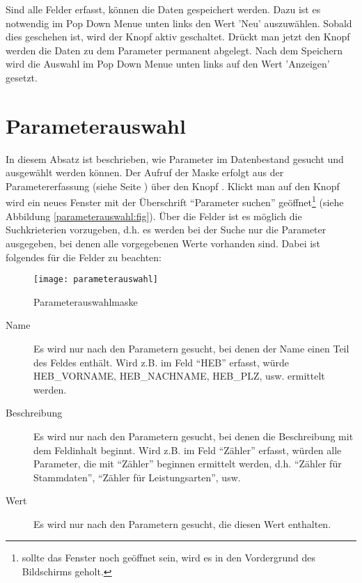 Sind alle Felder erfasst, können die Daten gespeichert werden. Dazu ist
es notwendig im Pop Down Menue unten links den Wert 'Neu' auszuwählen.
Sobald dies geschehen ist, wird der Knopf  aktiv 
geschaltet. Drückt man jetzt den Knopf  werden die Daten
zu dem Parameter permanent abgelegt. Nach dem Speichern wird die Auswahl im 
Pop Down Menue unten links auf den Wert 'Anzeigen' gesetzt.




\section{Parameterauswahl\label{parameterauswahl:abs}}
In diesem Absatz ist beschrieben, wie Parameter im Datenbestand gesucht und
ausgewählt werden können. Der  Aufruf der Maske erfolgt aus der 
Parametererfassung (siehe Seite \pageref{parameterpflege:fig}) 
über den Knopf . 
Klickt man auf den Knopf  wird ein neues Fenster mit der
Überschrift ``Parameter suchen'' geöffnet\footnote{sollte das Fenster 
noch geöffnet sein, wird es in den Vordergrund des Bildschirms geholt.} 
(siehe Abbildung \vref{parameterauswahl:fig}). Über die Felder  ist es möglich die
Suchkrieterien vorzugeben, d.h. es werden bei der Suche nur die Parameter
ausgegeben, bei denen alle vorgegebenen Werte vorhanden sind. Dabei ist
folgendes für die Felder zu beachten:

\begin{figure}[ht]
\centering
\texttt{[image: parameterauswahl]}
\caption{Parameterauswahlmaske\label{parameterauswahl:fig}}
\end{figure}

\begin{description}
\item[Name] Es wird nur nach den Parametern gesucht, bei denen der Name
einen Teil des Feldes enthält.
Wird z.B. im Feld  ``HEB'' erfasst,
würde HEB\_VORNAME, HEB\_NACH\-NAME, HEB\_PLZ, usw. ermittelt werden.
\item[Beschreibung] Es wird nur nach den Parametern gesucht, bei denen die
Beschreibung mit dem Feldinhalt beginnt. Wird z.B. im Feld 
 ``Zähler'' erfasst,
würden alle Parameter, die mit ``Zähler'' beginnen ermittelt werden, d.h.
``Zähler für Stammdaten'', ``Zähler für Leistungsarten'', usw.
\item[Wert] Es wird nur nach den Parametern gesucht, die diesen Wert
enthalten.
\end{description}

